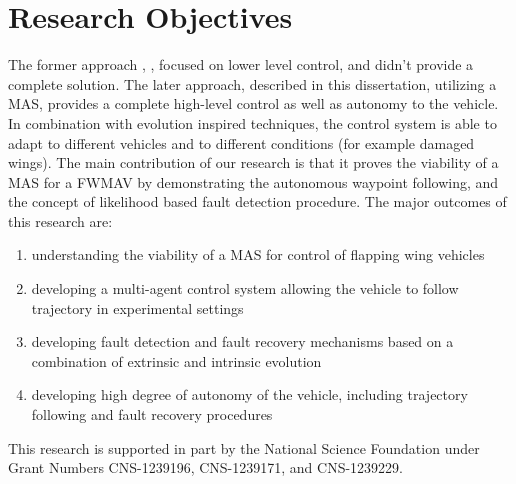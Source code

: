 \section{Research Objectives}
\label{sec:researchObjectives}

The former approach \cite{Perseghetti}, \cite{Boddhu}, \cite{Botha} focused on lower level control, and didn't provide a complete solution. The later approach, described in this dissertation, utilizing a MAS, provides a complete high-level control as well as autonomy to the vehicle. In combination with evolution inspired techniques, the control system is able to adapt to different vehicles and to different conditions (for example damaged wings). The main contribution of our research is that it proves the viability of a MAS for a FWMAV by demonstrating the autonomous waypoint following, and the concept of likelihood based fault detection procedure. The major outcomes of this research are:

\begin{enumerate}
\item understanding the viability of a MAS for control of flapping wing vehicles
\item developing a multi-agent control system allowing the vehicle to follow trajectory in experimental settings
\item developing fault detection and fault recovery mechanisms based on a combination of extrinsic and intrinsic evolution
\item developing high degree of autonomy of the vehicle, including trajectory following and fault recovery procedures \end{enumerate}

This research is supported in part by the National Science Foundation under Grant Numbers CNS-1239196, CNS-1239171, and CNS-1239229.
